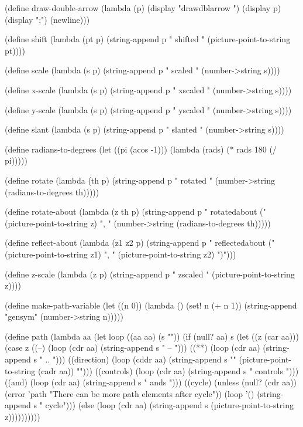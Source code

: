 {(define draw-double-arrow
  (lambda (p)
    (display "drawdblarrow ") (display p) (display ";")
    (newline)))

(define shift
  (lambda (pt p)
    (string-append p " shifted "
                   (picture-point-to-string pt))))

(define scale
  (lambda (s p)
    (string-append p " scaled "
                   (number->string s))))

(define x-scale
  (lambda (s p)
    (string-append p " xscaled " 
                   (number->string s))))

(define y-scale
  (lambda (s p)
    (string-append p " yscaled " 
                   (number->string s))))

(define slant
  (lambda (s p)
    (string-append p " slanted " 
                   (number->string s))))

(define radians-to-degrees
  (let ((pi (acos -1)))
    (lambda (rads)
      (* rads 180 (/ pi)))))

(define rotate
  (lambda (th p)
    (string-append p " rotated " 
                   (number->string 
                     (radians-to-degrees th)))))

(define rotate-about
  (lambda (z th p)
    (string-append p " rotatedabout ("
                   (picture-point-to-string z)
                   ", "
                   (number->string
                     (radians-to-degrees th)))))

(define reflect-about
  (lambda (z1 z2 p)
    (string-append p " reflectedabout ("
                   (picture-point-to-string z1)
                   ", "
                   (picture-point-to-string z2)
                   ")")))


(define z-scale
  (lambda (z p)
    (string-append p " zscaled "
                   (picture-point-to-string z))))

(define make-path-variable
  (let ((n 0))
    (lambda ()
      (set! n (+ n 1))
      (string-append "gensym" 
                     (number->string n)))))


(define path 
  (lambda aa
    (let loop ((aa aa) (s ""))
      (if (null? aa) s
          (let ((z (car aa)))
            (case z
              ((--) (loop (cdr aa) (string-append s " -- ")))
              ((**) (loop (cdr aa) (string-append s " .. ")))
              ((direction) (loop (cddr aa)
                                 (string-append s "{"
                                                (picture-point-to-string (cadr aa))
                                                "}")))
              ((controls) (loop (cdr aa) (string-append s " controls ")))
              ((and) (loop (cdr aa) (string-append s " ands ")))
              ((cycle) 
               (unless (null? (cdr aa))
                 (error 'path "There can be more path elements after cycle"))
               (loop '() (string-append s " cycle")))
              (else
                (loop (cdr aa)
                      (string-append s
                                     (picture-point-to-string z))))))))))

}
